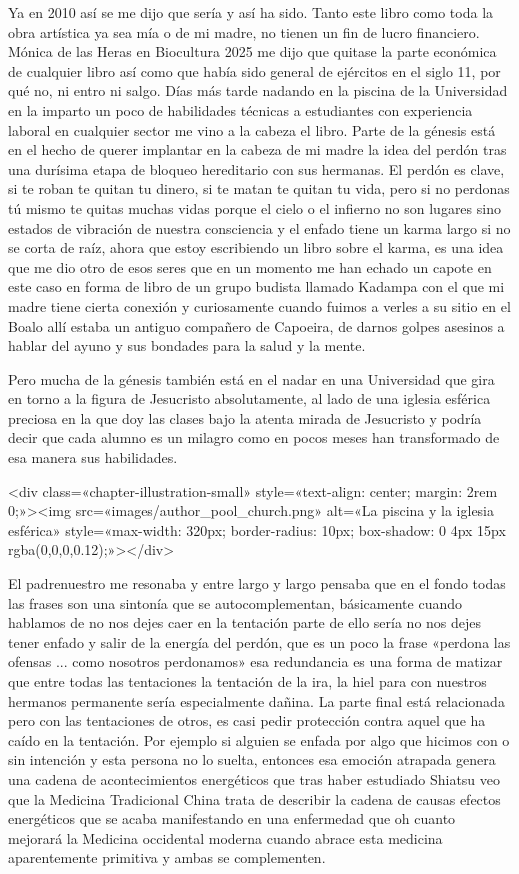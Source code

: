 \documentclass[11pt,a5paper]{book}
\begin{document}
Ya en 2010 así se me dijo que sería y así ha sido. Tanto este libro como toda la obra artística ya sea mía o de mi madre, no tienen un fin de lucro financiero. Mónica de las Heras en Biocultura 2025 me dijo que quitase la parte económica de cualquier libro así como que había sido general de ejércitos en el siglo 11, por qué no, ni entro ni salgo. Días más tarde nadando en la piscina de la Universidad en la imparto un poco de habilidades técnicas a estudiantes con experiencia laboral en cualquier sector me vino a la cabeza el libro. Parte de la génesis está en el hecho de querer implantar en la cabeza de mi madre la idea del perdón tras una durísima etapa de bloqueo hereditario con sus hermanas. El perdón es clave, si te roban te quitan tu dinero, si te matan te quitan tu vida, pero si no perdonas tú mismo te quitas muchas vidas porque el cielo o el infierno no son lugares sino estados de vibración de nuestra consciencia y el enfado tiene un karma largo si no se corta de raíz, ahora que estoy escribiendo un libro sobre el karma, es una idea que me dio otro de esos seres que en un momento me han echado un capote en este caso en forma de libro de un grupo budista llamado Kadampa con el que mi madre tiene cierta conexión y curiosamente cuando fuimos a verles a su sitio en el Boalo allí estaba un antiguo compañero de Capoeira, de darnos golpes asesinos a hablar del ayuno y sus bondades para la salud y la mente.

Pero mucha de la génesis también está en el nadar en una Universidad que gira en torno a la figura de Jesucristo absolutamente, al lado de una iglesia esférica preciosa en la que doy las clases bajo la atenta mirada de Jesucristo y podría decir que cada alumno es un milagro como en pocos meses han transformado de esa manera sus habilidades. 

<div class=«chapter-illustration-small» style=«text-align: center; margin: 2rem 0;»><img src=«images/author_pool_church.png» alt=«La piscina y la iglesia esférica» style=«max-width: 320px; border-radius: 10px; box-shadow: 0 4px 15px rgba(0,0,0,0.12);»></div>

El padrenuestro me resonaba y entre largo y largo pensaba que en el fondo todas las frases son una sintonía que se autocomplementan, básicamente cuando hablamos de no nos dejes caer en la tentación parte de ello sería no nos dejes tener enfado y salir de la energía del perdón, que es un poco la frase «perdona las ofensas ... como nosotros perdonamos» esa redundancia es una forma de matizar que entre todas las tentaciones la tentación de la ira, la hiel para con nuestros hermanos permanente sería especialmente dañina. La parte final está relacionada pero con las tentaciones de otros, es casi pedir protección contra aquel que ha caído en la tentación. Por ejemplo si alguien se enfada por algo que hicimos con o sin intención y esta persona no lo suelta, entonces esa emoción atrapada genera una cadena de acontecimientos energéticos que tras haber estudiado Shiatsu veo que la Medicina Tradicional China trata de describir la cadena de causas efectos energéticos que se acaba manifestando en una enfermedad que oh cuanto mejorará la Medicina occidental moderna cuando abrace esta medicina aparentemente primitiva y ambas se complementen.
\end{document}
